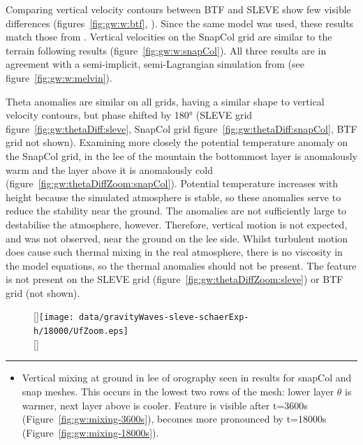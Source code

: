 Comparing vertical velocity contours between BTF and SLEVE show few visible differences (figures~\ref{fig:gw:w:btf}, ).  Since the same model was used, these results match those from \textcite{weller-shahrokhi2014}.  Vertical velocities on the SnapCol grid are similar to the terrain following results (figure~\ref{fig:gw:w:snapCol}).  All three results are in agreement with a semi-implicit, semi-Lagrangian simulation from \textcite{melvin2010} (see figure~\ref{fig:gw:w:melvin}).

Theta anomalies are similar on all grids, having a similar shape to vertical velocity contours, but phase shifted by \ang{180} (SLEVE grid figure~\ref{fig:gw:thetaDiff:sleve}, SnapCol grid figure~\ref{fig:gw:thetaDiff:snapCol}, BTF grid not shown). 
Examining more closely the potential temperature anomaly on the SnapCol grid, in the lee of the mountain the bottommost layer is anomalously warm and the layer above it is anomalously cold (figure~\ref{fig:gw:thetaDiffZoom:snapCol}).  Potential temperature increases with height because the simulated atmosphere is stable, so these anomalies serve to reduce the stability near the ground.  The anomalies are not sufficiently large to destabilise the atmosphere, however.   Therefore, vertical motion is not expected, and was not observed, near the ground on the lee side.   Whilst turbulent motion does cause such thermal mixing in the real atmosphere, there is no viscosity in the model equations, so the thermal anomalies should not be present.  The feature is not present on the SLEVE grid (figure~\ref{fig:gw:thetaDiffZoom:sleve}) or BTF grid (not shown).

\begin{figure}
	[\textwidth]{\texttt{[image: data/gravityWaves-sleve-schaerExp-h/18000/UfZoom.eps]}} \\
	[\textwidth]{\TODO{}} \\
	\caption{}
	\label{fig:gw:flow}
\end{figure}

\hrule

\begin{itemize}
\item Vertical mixing at ground in lee of orography seen in results for snapCol and snap meshes.  This occurs in the lowest two rows of the mesh: lower layer $\theta$ is warmer, next layer above is cooler.  Feature is visible after t=3600s (Figure~\ref{fig:gw:mixing-3600s}), becomes more pronounced by t=18000s (Figure~\ref{fig:gw:mixing-18000s}).
\end{itemize}

